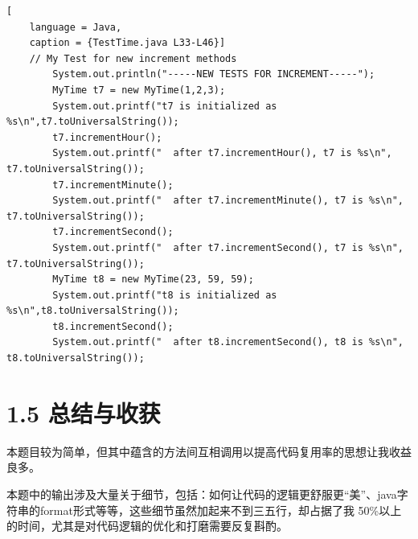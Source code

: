 \begin{lstlisting}[
    language = Java,
    caption = {TestTime.java L33-L46}]
    // My Test for new increment methods
        System.out.println("-----NEW TESTS FOR INCREMENT-----");
        MyTime t7 = new MyTime(1,2,3);
        System.out.printf("t7 is initialized as %s\n",t7.toUniversalString());
        t7.incrementHour();
        System.out.printf("  after t7.incrementHour(), t7 is %s\n", t7.toUniversalString());
        t7.incrementMinute();
        System.out.printf("  after t7.incrementMinute(), t7 is %s\n", t7.toUniversalString());
        t7.incrementSecond();
        System.out.printf("  after t7.incrementSecond(), t7 is %s\n", t7.toUniversalString());
        MyTime t8 = new MyTime(23, 59, 59);
        System.out.printf("t8 is initialized as %s\n",t8.toUniversalString());
        t8.incrementSecond();
        System.out.printf("  after t8.incrementSecond(), t8 is %s\n", t8.toUniversalString());
\end{lstlisting}

\section{1.5 总结与收获}

本题目较为简单，但其中蕴含的方法间互相调用以提高代码复用率的思想让我收益良多。

本题中的输出涉及大量关于细节，包括：如何让代码的逻辑更舒服更“美”、java字符串的format形式等等，这些细节虽然加起来不到三五行，却占据了我
50\%以上的时间，尤其是对代码逻辑的优化和打磨需要反复斟酌。

